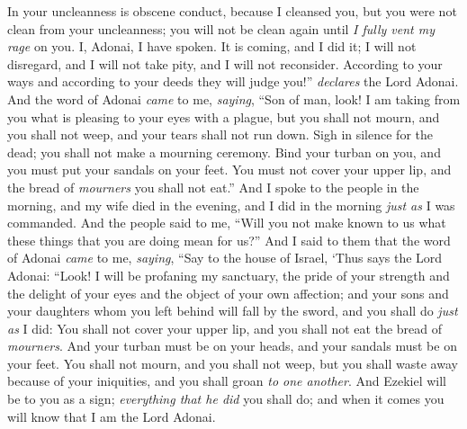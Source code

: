 \begin{biblechapter}
\verse In your uncleanness is obscene conduct, because I cleansed you, but you were not clean from your uncleanness; you will not be clean again until \textit{I fully vent my rage} on you.
\verse I, Adonai, I have spoken. It is coming, and I did it; I will not disregard, and I will not take pity, and I will not reconsider. According to your ways and according to your deeds they will judge you!” \textit{declares} the Lord Adonai.
\verse And the word of Adonai \textit{came} to me, \textit{saying},
\verse “Son of man, look! I am taking from you what is pleasing to your eyes with a plague, but you shall not mourn, and you shall not weep, and your tears shall not run down.
\verse Sigh in silence for the dead; you shall not make a mourning ceremony. Bind your turban on you, and you must put your sandals on your feet. You must not cover your upper lip, and the bread of \textit{mourners} you shall not eat.”
\verse And I spoke to the people in the morning, and my wife died in the evening, and I did in the morning \textit{just as} I was commanded.
\verse And the people said to me, “Will you not make known to us what these things that you are doing mean for us?”
\verse And I said to them that the word of Adonai \textit{came} to me, \textit{saying},
\verse “Say to the house of Israel, ‘Thus says the Lord Adonai: “Look! I will be profaning my sanctuary, the pride of your strength and the delight of your eyes and the object of your own affection; and your sons and your daughters whom you left behind will fall by the sword,
\verse and you shall do \textit{just as} I did: You shall not cover your upper lip, and you shall not eat the bread of \textit{mourners}.
\verse And your turban must be on your heads, and your sandals must be on your feet. You shall not mourn, and you shall not weep, but you shall waste away because of your iniquities, and you shall groan \textit{to one another}.
\verse And Ezekiel will be to you as a sign; \textit{everything that he did} you shall do; and when it comes you will know that I am the Lord Adonai.

\end{biblechapter}
